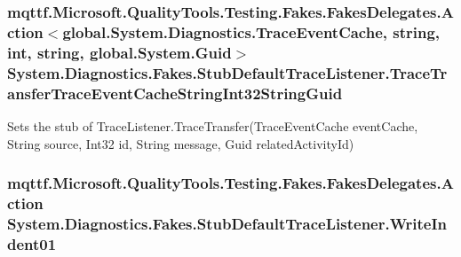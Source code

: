 \hypertarget{class_system_1_1_diagnostics_1_1_fakes_1_1_stub_default_trace_listener_a1f1b9c4b0c96dc261159c483b6453b35}{
\subsubsection[{Trace\-Transfer\-Trace\-Event\-Cache\-String\-Int32\-String\-Guid}]{\setlength{\rightskip}{0pt plus 5cm}mqttf.\-Microsoft.\-Quality\-Tools.\-Testing.\-Fakes.\-Fakes\-Delegates.\-Action$<$global.\-System.\-Diagnostics.\-Trace\-Event\-Cache, string, int, string, global.\-System.\-Guid$>$ System.\-Diagnostics.\-Fakes.\-Stub\-Default\-Trace\-Listener.\-Trace\-Transfer\-Trace\-Event\-Cache\-String\-Int32\-String\-Guid}}\label{class_system_1_1_diagnostics_1_1_fakes_1_1_stub_default_trace_listener_a1f1b9c4b0c96dc261159c483b6453b35}


Sets the stub of Trace\-Listener.\-Trace\-Transfer(\-Trace\-Event\-Cache event\-Cache, String source, Int32 id, String message, Guid related\-Activity\-Id)

\hypertarget{class_system_1_1_diagnostics_1_1_fakes_1_1_stub_default_trace_listener_a670734ea7bbeee90f07d5188f5ba6601}{
\subsubsection[{Write\-Indent01}]{\setlength{\rightskip}{0pt plus 5cm}mqttf.\-Microsoft.\-Quality\-Tools.\-Testing.\-Fakes.\-Fakes\-Delegates.\-Action System.\-Diagnostics.\-Fakes.\-Stub\-Default\-Trace\-Listener.\-Write\-Indent01}}\label{class_system_1_1_diagnostics_1_1_fakes_1_1_stub_default_trace_listener_a670734ea7bbeee90f07d5188f5ba6601}



